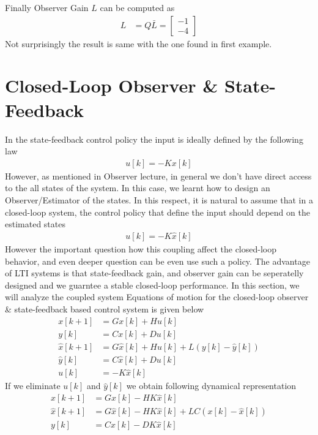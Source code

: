 \documentclass[twoside]{article}
\begin{document}
%
Finally Observer Gain $L$ can be computed as
%
%
\begin{align*}
 L &= Q \bar{L} = 
 \left[ \begin{array}{c} -1 \\ -4 \end{array} \right]
\end{align*}
% 
Not surprisingly the result is same with the one found in
first example.

\section*{Closed-Loop Observer \& State-Feedback}

In the state-feedback control policy the input is ideally defined
by the following law
%
\begin{align*}
 u[k] = - K x[k]
\end{align*}
%
However, as mentioned in Observer lecture, in general we don't have
direct access to the all states of the system. In this case, we learnt
how to design an Observer/Estimator of the states. In this respect,
it is natural to assume that in a closed-loop system, the control
policy that define the input should depend on the estimated states
%
\begin{align*}
 u[k] = - K \hat{x}[k]
\end{align*}
%
However the important question how this coupling affect the
closed-loop behavior, and even deeper question can be even 
use such a policy. The advantage of LTI systems is that 
state-feedback gain, and observer gain can be seperatelly
designed and we guarntee a stable closed-loop performance. 
In this section, we will analyze the coupled system
%
Equations of motion for the closed-loop observer \& state-feedback
based control system is given below
%
\begin{align*}
   x[k+1] &= G x[k] + H u[k]
  \\ 
   y[k] &= C x[k] + D u[k]
  \\
  \hat{x}[k+1] &= G \hat{x}[k] + H u[k] + L \left( y[k] - \hat{y}[k] \right) 
  \\
  \hat{y}[k] &= C \hat{x}[k] + D u[k]
  \\
   u[k] &= -K \hat{x}[k]
\end{align*}
%
If we eliminate $u[k]$ and $\hat{y}[k]$ we obtain following 
dynamical representation
%
\begin{align*}
   x[k+1] &= G x[k] - H K \hat{x}[k] 
  \\
  \hat{x}[k+1] &= G \hat{x}[k] - H K \hat{x}[k] + L C \left( x[k] -
                 \hat{x}[k] \right) 
  \\ 
   y[k] &= C x[k] - D K \hat{x}[k] 
\end{align*}
\end{document}
